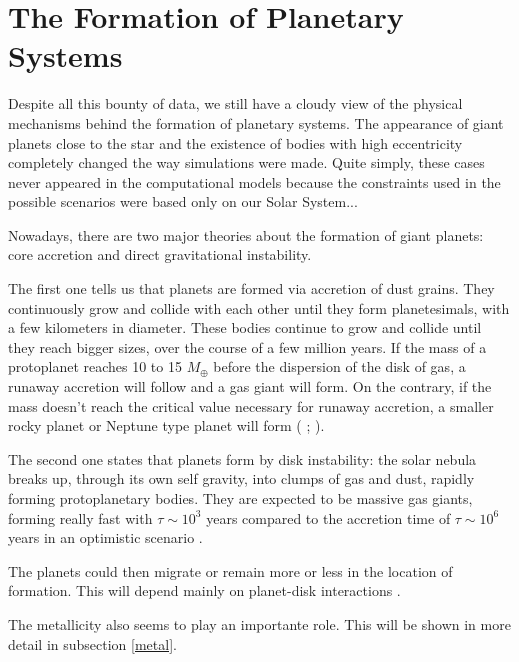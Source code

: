 \documentclass[dvips,12pt,a4paper]{report}
\begin{document}
\section {The Formation of Planetary Systems}
\label {planets}
\indent Despite all this bounty of data, we still have a cloudy view of the physical mechanisms behind the formation of planetary systems. The appearance of giant planets close to the star and the existence of bodies with high eccentricity completely changed the way simulations were made. Quite simply, these cases never appeared in the computational models because the constraints used in the possible scenarios were based only on our Solar System...

Nowadays, there are two major theories about the formation of giant planets: core accretion and direct gravitational instability.

The first one tells us that planets are formed via accretion of dust grains. They continuously grow and collide with each other until they form planetesimals, with a few kilometers in diameter. These bodies continue to grow and collide until they reach bigger sizes, over the course of a few million years. If the mass of a protoplanet reaches 10 to 15 $M_{\oplus}$ before the dispersion of the disk of gas, a runaway accretion will follow and a gas giant will form. On the contrary, if the mass doesn't reach the critical value necessary for runaway accretion, a smaller rocky planet or Neptune type planet will form (\citeauthor{Pollack-1996} \citeyear{Pollack-1996}; \citeauthor{Alibert-2006} \citeyear{Alibert-2006}).

The second one states that planets form by disk instability: the solar nebula breaks up, through its own self gravity, into clumps of gas and dust, rapidly forming protoplanetary bodies. They are expected to be massive gas giants, forming really fast with  $\tau\sim10^3$ years compared to the accretion time of $\tau\sim10^6$ years in an optimistic scenario \citep{Boss-1997}.

The planets could then migrate or remain more or less in the location of formation. This will depend mainly on planet-disk interactions \citep{Trilling-1998}.

The metallicity also seems to play an importante role. This will be shown in more detail in subsection \ref{metal}.

\end{document}
